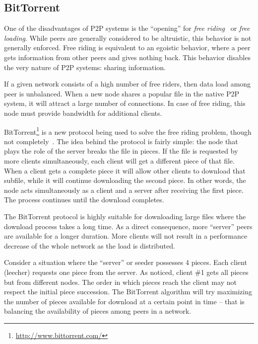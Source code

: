 \subsection{BitTorrent}

One of the disadvantages of P2P systems is the ``opening'' for \textit{free
riding}~\cite{free-riding} or \textit{free loading}. While peers are generally
considered to be altruistic, this behavior is not generally enforced. Free
riding is equivalent to an egoistic behavior, where a peer gets information
from other peers and gives nothing back. This behavior disables the very
nature of P2P systems: sharing information.

If a given network consists of a high number of free riders, then data load
among peer is unbalanced. When a new node shares a popular file in the native
P2P system, it will attract a large number of connections. In case of free
riding, this node must provide bandwidth for additional clients.

BitTorrent\footnote{\url{http://www.bittorrent.com/}} is a new protocol being used to solve the free riding problem,
though not completely~\cite{free-riding}. The idea behind the protocol is
fairly simple: the node that plays the role of the server breaks the file in
pieces. If the file is requested by more clients simultaneously, each client
will get a different piece of that file. When a client gets a complete piece
it will allow other clients to download that subfile, while it will continue
downloading the second piece. In other words, the node acts simultaneously as
a client and a server after receiving the first piece. The process continues
until the download completes.

The BitTorrent protocol is highly suitable for downloading large files where
the download process takes a long time. As a direct consequence, more
``server'' peers are available for a longer duration. More clients will not
result in a performance decrease of the whole network as the load is
distributed.

Consider a situation where the ``server'' or seeder possesses 4 pieces. Each
client (leecher) requests one piece from the server. As noticed, client \#1
gets all pieces but from different nodes. The order in which pieces reach the
client may not respect the initial piece succession. The BitTorrent algorithm
will try maximizing the number of pieces available for download at a certain
point in time -- that is balancing the availability of pieces among peers in a
network.

